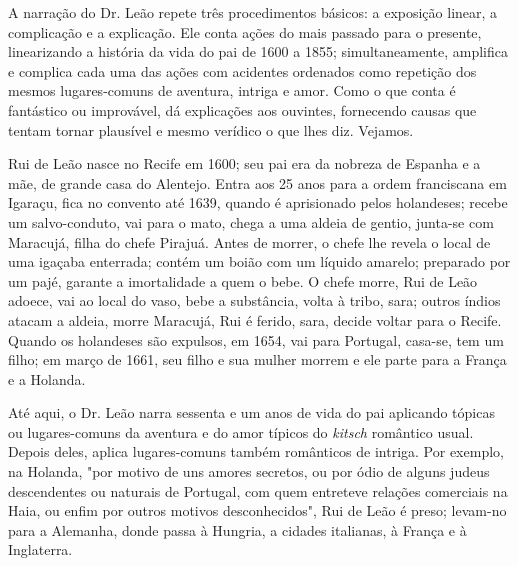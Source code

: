 A narração do Dr. Leão repete três procedimentos básicos: a exposição
linear, a complicação e a explicação. Ele conta ações do mais passado
para o presente, linearizando a história da vida do pai de 1600 a 1855;
simultaneamente, amplifica e complica cada uma das ações com acidentes
ordenados como repetição dos mesmos lugares-comuns de aventura, intriga
e amor. Como o que conta é fantástico ou improvável, dá explicações aos
ouvintes, fornecendo causas que tentam tornar plausível e mesmo verídico
o que lhes diz. Vejamos.

Rui de Leão nasce no Recife em 1600; seu pai era da nobreza de Espanha e
a mãe, de grande casa do Alentejo. Entra aos 25 anos para a ordem
franciscana em Igaraçu, fica no convento até 1639, quando é aprisionado
pelos holandeses; recebe um salvo-conduto, vai para o mato, chega a uma
aldeia de gentio, junta-se com Maracujá, filha do chefe Pirajuá. Antes
de morrer, o chefe lhe revela o local de uma igaçaba enterrada; contém
um boião com um líquido amarelo; preparado por um pajé, garante a
imortalidade a quem o bebe. O chefe morre, Rui de Leão adoece, vai ao
local do vaso, bebe a substância, volta à tribo, sara; outros índios
atacam a aldeia, morre Maracujá, Rui é ferido, sara, decide voltar para
o Recife. Quando os holandeses são expulsos, em 1654, vai para Portugal,
casa-se, tem um filho; em março de 1661, seu filho e sua mulher morrem e
ele parte para a França e a Holanda.

Até aqui, o Dr. Leão narra sessenta e um anos de vida do pai aplicando
tópicas ou lugares-comuns da aventura e do amor típicos do \emph{kitsch}
romântico usual. Depois deles, aplica lugares-comuns também românticos
de intriga. Por exemplo, na Holanda, "por motivo de uns amores secretos,
ou por ódio de alguns judeus descendentes ou naturais de Portugal, com
quem entreteve relações comerciais na Haia, ou enfim por outros motivos
desconhecidos", Rui de Leão é preso; levam-no para a Alemanha, donde
passa à Hungria, a cidades italianas, à França e à Inglaterra.

